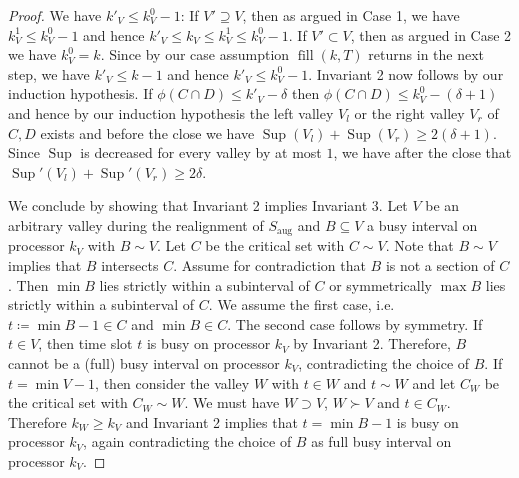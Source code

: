 \documentclass[a4paper]{article}
\DeclareMathOperator{\aug}{aug}
\DeclareMathOperator{\fillop}{fill}
\DeclareMathOperator{\res}{Sup}
\begin{document}
\begin{proof}
      We have $k'_V \leq k^0_V - 1$:
      If $V' \supseteq V$, then as argued in Case 1, we have $k^1_V \leq k^0_V - 1$ and hence $k'_V \leq k_V \leq k^1_V \leq k^0_V -1$.
      If $V' \subset V$, then as argued in Case 2 we have $k^0_V = k$.
      Since by our case assumption $\fillop(k, T)$ returns in the next step, we have $k'_V \leq k - 1$ and hence $k'_V \leq k^0_V -1$.
      Invariant 2 now follows by our induction hypothesis.
      If $\phi(C \cap D) \leq k'_V - \delta$ then $\phi(C \cap D) \leq k^0_V - (\delta + 1)$ and hence by our induction hypothesis the left valley $V_l$ or the right valley $V_r$ of $C, D$ exists and before the close we have $\res(V_l) + \res(V_r) \geq 2 (\delta + 1)$.
      Since $\res$ is decreased for every valley by at most $1$, we have after the close that $\res'(V_l) + \res'(V_r) \geq 2 \delta$.

  We conclude by showing that Invariant 2 implies Invariant 3.
  Let $V$ be an arbitrary valley during the realignment of $S_{\aug}$ and $B \subseteq V$ a busy interval on processor $k_V$ with $B \sim V$.
  Let $C$ be the critical set with $C \sim V$.
  Note that $B \sim V$ implies that $B$ intersects $C$.
  Assume for contradiction that $B$ is not a section of $C$.
  Then $\min B$ lies strictly within a subinterval of $C$ or symmetrically $\max B$ lies strictly within a subinterval of $C$.
  We assume the first case, i.e.\ $t\coloneqq \min B - 1 \in C$ and $\min B \in C$.
  The second case follows by symmetry.
  If $t \in V$, then time slot $t$ is busy on processor $k_V$ by Invariant 2.
  Therefore, $B$ cannot be a (full) busy interval on processor $k_V$, contradicting the choice of $B$.
  If $t = \min V-1$, then consider the valley $W$ with $t \in W$ and $t \sim W$ and let $C_W$ be the critical set with $C_W \sim W$.
  We must have $W \supset V$, $W \succ V$ and $t \in C_W$.
  Therefore $k_W \geq k_V$ and Invariant 2 implies that $t = \min B - 1$ is busy on processor $k_V$, again contradicting the choice of $B$ as full busy interval on processor $k_V$.
\end{proof}
\end{document}
